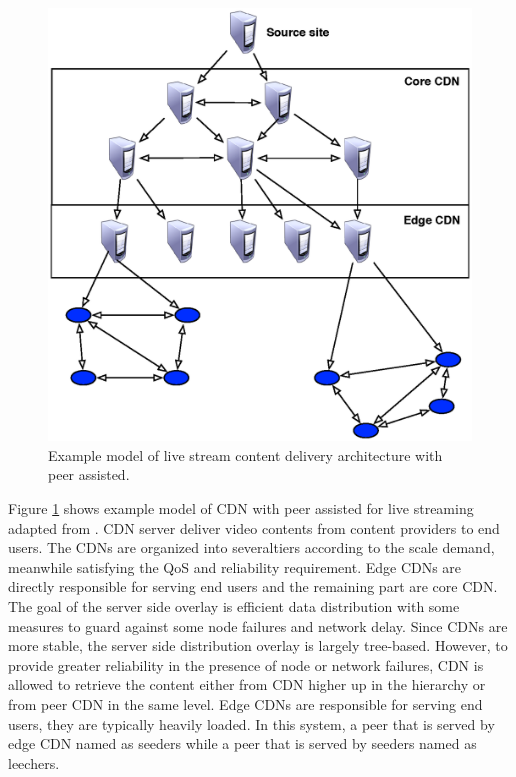 \documentclass[conference]{IEEEtran}
\begin{document}
\begin{figure}[thb]
\begin{center}
\includegraphics[scale=0.5]{graphs/livesky.eps}
\end{center}
\caption{Example model of live stream content delivery architecture with peer assisted.}
\label{fig:iptv}
\end{figure} 

Figure \ref{fig:iptv} shows example model of CDN with peer assisted for live streaming adapted from \cite{Yin:2010:LEC:1823746.1823750}.
CDN server deliver video contents from content providers to end users. 
The CDNs are organized into severaltiers according to the scale demand, meanwhile satisfying the QoS and reliability requirement. 
Edge CDNs are directly responsible for serving end users and the remaining part are core CDN.
The goal of the server side overlay is efficient data distribution with some measures to guard against some node failures and network delay.
Since CDNs are more stable, the server side distribution overlay is largely tree-based. 
However, to provide greater reliability in the presence of node or network failures, CDN is allowed to retrieve the content either from CDN higher up in the hierarchy or from peer CDN in the same level.
Edge CDNs are responsible for serving end users, they are typically heavily loaded. 
In this system, a peer that is served by edge CDN named as seeders while a peer that is served by seeders named as leechers. 
\end{document}
